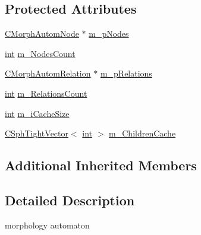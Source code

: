 \subsection*{Protected Attributes}
\begin{DoxyCompactItemize}
\item 
\hyperlink{structCMorphAutomNode}{C\-Morph\-Autom\-Node} $\ast$ \hyperlink{classCMorphAutomat_a3f7881d65cc8ec2a0977f995e46fe3ed}{m\-\_\-p\-Nodes}
\item 
\hyperlink{sphinxexpr_8cpp_a4a26e8f9cb8b736e0c4cbf4d16de985e}{int} \hyperlink{classCMorphAutomat_a04f278a15cdd9a0e41ae55503e7c5625}{m\-\_\-\-Nodes\-Count}
\item 
\hyperlink{structCMorphAutomRelation}{C\-Morph\-Autom\-Relation} $\ast$ \hyperlink{classCMorphAutomat_a89b2e7c587803060660791aa877f5cc3}{m\-\_\-p\-Relations}
\item 
\hyperlink{sphinxexpr_8cpp_a4a26e8f9cb8b736e0c4cbf4d16de985e}{int} \hyperlink{classCMorphAutomat_aad30591acbb8dac7b9db5e5a9ac3cacf}{m\-\_\-\-Relations\-Count}
\item 
\hyperlink{sphinxexpr_8cpp_a4a26e8f9cb8b736e0c4cbf4d16de985e}{int} \hyperlink{classCMorphAutomat_a9c316e1eae4f39ca06901ab9f069df4c}{m\-\_\-i\-Cache\-Size}
\item 
\hyperlink{classCSphTightVector}{C\-Sph\-Tight\-Vector}$<$ \hyperlink{sphinxexpr_8cpp_a4a26e8f9cb8b736e0c4cbf4d16de985e}{int} $>$ \hyperlink{classCMorphAutomat_a07b9d37724a682cf56c14d690bcdecf2}{m\-\_\-\-Children\-Cache}
\end{DoxyCompactItemize}
\subsection*{Additional Inherited Members}


\subsection{Detailed Description}
morphology automaton 

